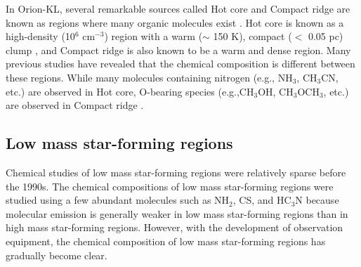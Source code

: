 In Orion-KL, several remarkable sources called Hot core and Compact ridge are known as regions where many organic molecules exist \citep{Blake+1987}. 
Hot core is known as a high-density (10$^6$ cm$^{-3}$) region with a warm ($\sim$ 150 K), compact ($<$ 0.05 pc) clump \citep{Zapata+2011}, and Compact ridge is also known to be a warm and dense region. 
Many previous studies have revealed that the chemical composition is different between these regions.
While many molecules containing nitrogen (e.g., NH$_3$, CH$_3$CN, etc.) are observed 
in Hot core, 
O-bearing species (e.g.,CH$_3$OH, CH$_3$OCH$_3$, etc.) are observed in Compact ridge \citep{Favre+2011a}.

\subsection{Low mass star-forming regions}
Chemical studies of low mass star-forming regions were relatively sparse before the 1990s.
The chemical compositions of low mass star-forming regions were studied using a few abundant
molecules such as NH$_2$, CS, and HC$_3$N because molecular emission is generally weaker in low mass star-forming regions than in high mass star-forming regions. 
However, with the development of observation equipment, the chemical composition of 
low mass star-forming regions has gradually become clear.

